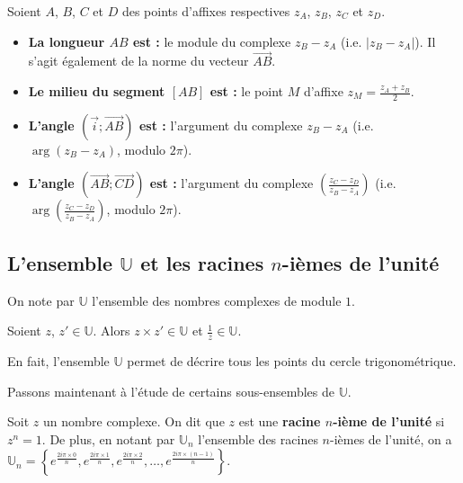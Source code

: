 	\begin{formula}[Propriétés]
		Soient $A$, $B$, $C$ et $D$ des points d'affixes respectives $z_A$, $z_B$, $z_C$ et $z_D$.
		\begin{itemize}
			\item \textbf{La longueur $AB$ est :} le module du complexe $z_B - z_A$ (i.e. $|z_B - z_A|$). Il s'agit également de la norme du vecteur $\overrightarrow{AB}$.
			\item \textbf{Le milieu du segment $[AB]$ est :} le point $M$ d'affixe $z_{M} = \frac{z_A + z_B}{2}$.
			\item \textbf{L'angle $(\overrightarrow{i}; \overrightarrow{AB})$ est :} l'argument du complexe $z_B - z_A$ (i.e. $\operatorname{arg}(z_B - z_A)$, modulo $2\pi$).
			\item \textbf{L'angle $(\overrightarrow{AB}; \overrightarrow{CD})$ est :} l'argument du complexe $\left(\frac{z_C - z_D}{z_B - z_A}\right)$ (i.e. $\operatorname{arg}{\left(\frac{z_C - z_D}{z_B - z_A}\right)}$, modulo $2\pi$).
		\end{itemize}
	\end{formula}

	\subsection{L'ensemble \texorpdfstring{$\mathbb{U}$}{U} et les racines \texorpdfstring{$n$}{n}-ièmes de l'unité}

	\begin{formula}
		On note par $\mathbb{U}$ l'ensemble des nombres complexes de module $1$.
	\end{formula}

	\begin{formula}
		Soient $z$, $z' \in \mathbb{U}$. Alors $z \times z' \in \mathbb{U}$ et $\frac{1}{z} \in \mathbb{U}$.
	\end{formula}

	En fait, l'ensemble $\mathbb{U}$ permet de décrire tous les points du cercle trigonométrique.

	Passons maintenant à l'étude de certains sous-ensembles de $\mathbb{U}$.

	\begin{formula}
		Soit $z$ un nombre complexe. On dit que $z$ est une \textbf{racine $n$-ième de l'unité} si $z^n = 1$.
		\newpar
		De plus, en notant par $\mathbb{U}_n$ l'ensemble des racines $n$-ièmes de l'unité, on a
		\newline
		$\mathbb{U}_n = \left\{ e^{\frac{2i\pi \times 0}{n}}, e^{\frac{2i\pi \times 1}{n}}, e^{\frac{2i\pi \times 2}{n}}, \dots, e^{\frac{2i\pi \times (n-1)}{n}} \right\}$.
	\end{formula}

